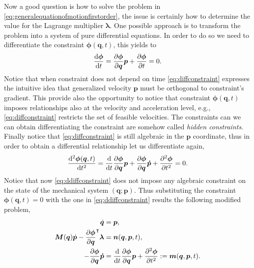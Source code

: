 Now a good question is how to solve the problem in
\cref{eq:generalequationofmotionfirstorder},
the issue is certainly how to determine the value for the
Lagrange multiplier $\bm{\lambda}$.
One possible approach is to transform the problem into a
system of pure differential equations.
In order to do so we need to differentiate the constraint
$\bm{\phi}(\bm{q},t)$, this yields to
\begin{equation}
	\label{eq:diffconstraint}
	\frac{\mathop{}\!\mathrm{d}\bm{\phi}}{\mathop{}\!\mathrm{d} t} =
	\frac{\partial\bm{\phi}}{\partial\bm{q}}\bm{p}+\frac{\partial\bm{\phi}}{\partial t}=0.
\end{equation}
Notice that when constraint does not depend on time \cref{eq:diffconstraint}
expresses the intuitive idea that generalized velocity $\bm{p}$ must be orthogonal
to constraint's gradient.
This provide also the opportunity to notice that constraint
$\bm{\phi}(\bm{q},t)$ imposes relationships also at the velocity
and acceleration level, e.g., \cref{eq:diffconstraint} restricts
the set of feasible velocities. The constraints can we can obtain
differentiating the constraint are somehow called \emph{hidden constraints}.
Finally notice that \cref{eq:diffconstraint} is still algebraic in
the $\bm{p}$ coordinate, thus in order to obtain a differential
relationship let us differentiate again,
\begin{equation}
	\label{eq:ddiffconstraint}
	\frac{\mathop{}\!\mathrm{d}^2\bm{\phi}(\bm{q},t)}{\mathop{}\!\mathrm{d} t^2}
	= \frac{\mathop{}\!\mathrm{d}}{\mathop{}\!\mathrm{d} t}\frac{\partial\bm{\phi}}{\partial\bm{q}}\bm{p}
	+\frac{\partial\bm{\phi}}{\partial\bm{q}}\bm{\dot{p}}+\frac{\partial^2\bm{\phi}}{\partial t^2}=0.
\end{equation}
Notice that now \cref{eq:ddiffconstraint} does not impose any algebraic
constraint on the state of the mechanical system $(\bm{q};\bm{p})$.
Thus substituting the constraint $\bm{\phi}(\bm{q},t) = 0$
with the one in \cref{eq:ddiffconstraint} results the following modified problem,
\begin{subequations}
\label{eq:generalequationofmotionfirstorderdiffconstraint}
	\begin{align}
		\dot{\bm{q}} &= \bm{p}, \\
		\bm{M}(\bm{q})\dot{\bm{p}}
		-\frac{\partial\bm{\phi}}{\partial\bm{q}}^{\intercal}\bm{\lambda}
		&= \bm{n}(\bm{q},\bm{p},t),\\
		-\frac{\partial\bm{\phi}}{\partial\bm{q}}\bm{\dot{p}}
		&= \frac{\mathop{}\!\mathrm{d}}{\mathop{}\!\mathrm{d} t}\frac{\partial\bm{\phi}}{\partial\bm{q}}\bm{p}
		+\frac{\partial^2\bm{\phi}}{\partial t^2} := \bm{m}(\bm{q},\bm{p},t).
	\end{align}
\end{subequations}
